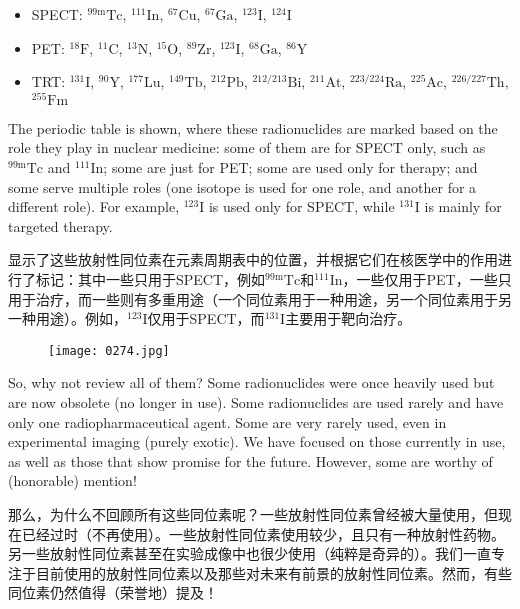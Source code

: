 \documentclass[dvipsnames, svgnames,a4paper,11pt]{article}
\begin{document}
\begin{itemize}
    \item SPECT: \(\mathrm{^{99m}Tc}\), \(\mathrm{^{111}In}\), \(\mathrm{^{67}Cu}\), \(\mathrm{^{67}Ga}\), \(\mathrm{^{123}I}\), \(\mathrm{^{124}I}\)
    \item PET: \(\mathrm{^{18}F}\), \(\mathrm{^{11}C}\), \(\mathrm{^{13}N}\), \(\mathrm{^{15}O}\), \(\mathrm{^{89}Zr}\), \(\mathrm{^{123}I}\), \(\mathrm{^{68}Ga}\), \(\mathrm{^{86}Y}\)
    \item TRT: \(\mathrm{^{131}I}\), \(\mathrm{^{90}Y}\), \(\mathrm{^{177}Lu}\), \(\mathrm{^{149}Tb}\), \(\mathrm{^{212}Pb}\), \(\mathrm{^{212/213}Bi}\), \(\mathrm{^{211}At}\), \(\mathrm{^{223/224}Ra}\), \(\mathrm{^{225}Ac}\), \(\mathrm{^{226/227}Th}\), \(\mathrm{^{255}Fm}\)
\end{itemize}

The periodic table is shown, where these radionuclides are marked based on the role they play in nuclear medicine: some of them are for SPECT only, such as \(\mathrm{^{99m}Tc}\) and \(\mathrm{^{111}In}\); some are just for PET; some are used only for therapy; and some serve multiple roles (one isotope is used for one role, and another for a different role). For example, \(\mathrm{^{123}I}\) is used only for SPECT, while \(\mathrm{^{131}I}\) is mainly for targeted therapy.

显示了这些放射性同位素在元素周期表中的位置，并根据它们在核医学中的作用进行了标记：其中一些只用于SPECT，例如\(\mathrm{^{99m}Tc}\)和\(\mathrm{^{111}In}\)，一些仅用于PET，一些只用于治疗，而一些则有多重用途（一个同位素用于一种用途，另一个同位素用于另一种用途）。例如，\(\mathrm{^{123}I}\)仅用于SPECT，而\(\mathrm{^{131}I}\)主要用于靶向治疗。

\begin{figure}[h]
	\centering
    \texttt{[image: 0274.jpg]}  
     \label{fig371}
\end{figure}

So, why not review all of them? Some radionuclides were once heavily used but are now obsolete (no longer in use). Some radionuclides are used rarely and have only one radiopharmaceutical agent. Some are very rarely used, even in experimental imaging (purely exotic). We have focused on those currently in use, as well as those that show promise for the future. However, some are worthy of (honorable) mention!

那么，为什么不回顾所有这些同位素呢？一些放射性同位素曾经被大量使用，但现在已经过时（不再使用）。一些放射性同位素使用较少，且只有一种放射性药物。另一些放射性同位素甚至在实验成像中也很少使用（纯粹是奇异的）。我们一直专注于目前使用的放射性同位素以及那些对未来有前景的放射性同位素。然而，有些同位素仍然值得（荣誉地）提及！
\end{document}

